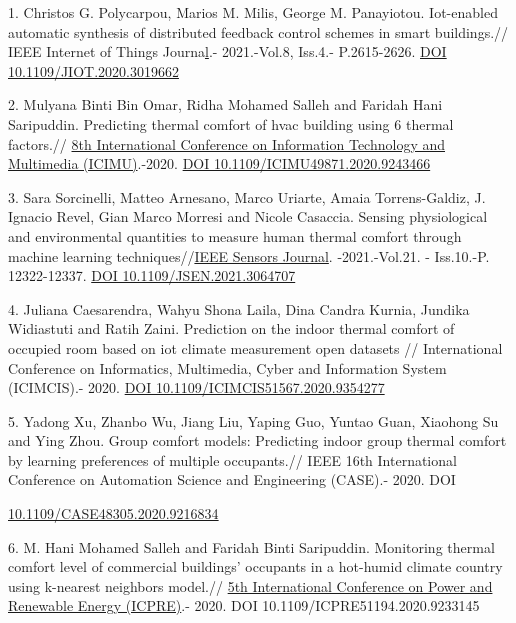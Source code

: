 \begin{references}
1. Christos G. Polycarpou, Marios M. Milis, George M. Panayiotou.
Iot-enabled automatic synthesis of distributed feedback control schemes
in smart buildings.// IEEE Internet of Things
Journa\href{https://ieeexplore.ieee.org/xpl/RecentIssue.jsp?punumber=6488907}{l}.-
2021.-Vol.8, Iss.4.- P.2615-2626.
\href{https://doi.org/10.1109/JIOT.2020.3019662}{DOI
10.1109/JIOT.2020.3019662}

2. Mulyana Binti Bin Omar, Ridha Mohamed Salleh and Faridah Hani
Saripuddin. Predicting thermal comfort of hvac building using 6 thermal
factors.//
\href{https://ieeexplore.ieee.org/xpl/conhome/9243083/proceeding}{8th
International Conference on Information Technology and Multimedia
(ICIMU)}.-2020.
\href{https://doi.org/10.1109/ICIMU49871.2020.9243466}{DOI
10.1109/ICIMU49871.2020.9243466}

3. Sara Sorcinelli, Matteo Arnesano, Marco Uriarte, Amaia
Torrens-Galdiz, J. Ignacio Revel, Gian Marco Morresi and Nicole
Casaccia. Sensing physiological and environmental quantities to measure
human thermal comfort through machine learning
techniques//\href{https://ieeexplore.ieee.org/xpl/RecentIssue.jsp?punumber=7361}{IEEE
Sensors Journal}. -2021.-Vol.21. - Iss.10.-P. 12322-12337.
\href{https://doi.org/10.1109/JSEN.2021.3064707}{DOI
10.1109/JSEN.2021.3064707}

4. Juliana Caesarendra, Wahyu Shona Laila, Dina Candra Kurnia, Jundika
Widiastuti and Ratih Zaini. Prediction on the indoor thermal comfort of
occupied room based on iot climate measurement open datasets //
International Conference on Informatics, Multimedia, Cyber and
Information System (ICIMCIS).- 2020.
\href{https://doi.org/10.1109/ICIMCIS51567.2020.9354277}{DOI
10.1109/ICIMCIS51567.2020.9354277}

5. Yadong Xu, Zhanbo Wu, Jiang Liu, Yaping Guo, Yuntao Guan, Xiaohong Su
and Ying Zhou. Group comfort models: Predicting indoor group thermal
comfort by learning preferences of multiple occupants.//
IEEE 16th International Conference on Automation Science and Engineering
(CASE).- 2020. DOI

\href{https://doi.org/10.1109/CASE48305.2020.9216834}{10.1109/CASE48305.2020.9216834}

6. M. Hani Mohamed Salleh and Faridah Binti Saripuddin. Monitoring
thermal comfort level of commercial buildings' occupants in a hot-humid
climate country using k-nearest neighbors model.//
\href{https://ieeexplore.ieee.org/xpl/conhome/9233041/proceeding}{5th
International Conference on Power and Renewable Energy (ICPRE)}.- 2020.
DOI 10.1109/ICPRE51194.2020.9233145


\end{references}
